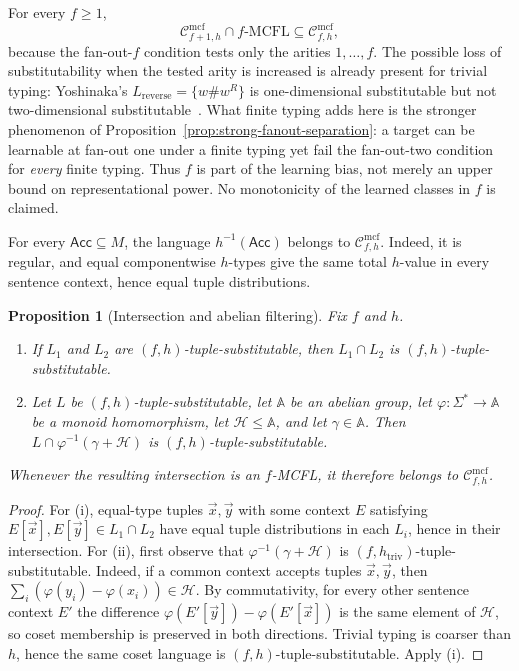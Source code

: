 \documentclass[11pt]{article}
\numberwithin{equation}{section}
\theoremstyle{plain}
\newtheorem{proposition}[theorem]{Proposition}
\theoremstyle{definition}
\theoremstyle{remark}
\newcommand{\Cmcf}[2]{\mathcal{C}^{\mathrm{mcf}}_{#1,#2}}
\newcommand{\tuple}[1]{\vec{#1}}
\begin{document}
For every $f\ge1$,
\[
  \Cmcf{f+1}{h}\cap f\text{-}\mathrm{MCFL}
  \subseteq \Cmcf{f}{h},
\]
because the fan-out-$f$ condition tests only the arities
$1,\ldots,f$.  The possible loss of substitutability when the tested arity is
increased is already present for trivial typing: Yoshinaka's
$L_{\mathrm{reverse}}=\{w\#w^R\}$ is one-dimensional substitutable but not
two-dimensional substitutable~\cite[Example~5]{Yoshinaka2011}.  What finite
typing adds here is the stronger phenomenon of
Proposition~\ref{prop:strong-fanout-separation}: a target can be learnable at
fan-out one under a finite typing yet fail the fan-out-two condition for
\emph{every} finite typing.  Thus $f$ is part of the learning bias, not merely
an upper bound on representational power.  No monotonicity of the learned
classes in $f$ is claimed.

For every $\mathsf{Acc}\subseteq M$, the language
$h^{-1}(\mathsf{Acc})$ belongs to $\Cmcf{f}{h}$.  Indeed, it is regular, and equal componentwise $h$-types give the
same total $h$-value in every sentence context, hence equal tuple
distributions.

\begin{proposition}[Intersection and abelian filtering]
\label{prop:abelian-coset-filter}
Fix $f$ and $h$.
\begin{enumerate}[label=(\roman*),leftmargin=*]
\item If $L_1$ and $L_2$ are $(f,h)$-tuple-substitutable, then
$L_1\cap L_2$ is $(f,h)$-tuple-substitutable.
\item Let $L$ be $(f,h)$-tuple-substitutable, let $\mathbb A$ be an abelian
group, let $\varphi:\Sigma^*\to\mathbb A$ be a monoid homomorphism, let
$\mathcal H\le\mathbb A$, and let $\gamma\in\mathbb A$.  Then
$L\cap\varphi^{-1}(\gamma+\mathcal H)$ is $(f,h)$-tuple-substitutable.
\end{enumerate}
Whenever the resulting intersection is an $f$-MCFL, it therefore belongs to
$\Cmcf{f}{h}$.
\end{proposition}

\begin{proof}
For (i), equal-type tuples $\tuple x,\tuple y$ with some context $E$ satisfying
$E[\tuple x],E[\tuple y]\in L_1\cap L_2$ have equal tuple distributions in each $L_i$, hence in their intersection.
For (ii), first observe that $\varphi^{-1}(\gamma+\mathcal H)$ is
$(f,h_{\mathrm{triv}})$-tuple-substitutable.  Indeed, if a common context
accepts tuples $\tuple x,\tuple y$, then
$\sum_i(\varphi(y_i)-\varphi(x_i))\in\mathcal H$.  By commutativity, for every other sentence
context $E'$ the difference
$\varphi(E'[\tuple y])-\varphi(E'[\tuple x])$ is the same element of
$\mathcal H$, so coset membership is preserved in both directions.  Trivial
typing is coarser than $h$, hence the same coset language is
$(f,h)$-tuple-substitutable.  Apply (i).
\end{proof}
\end{document}

